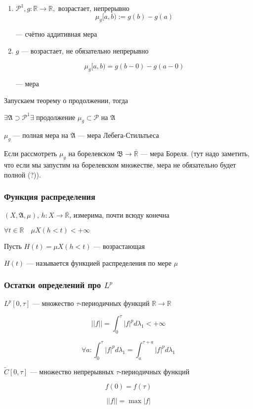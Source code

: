 \documentclass{article}
\def\rinf{\overline{\mathbb{R}}}
\begin{document}
\begin{enumerate}
    \item $\mathcal{P}^{1}, g: \mathbb{R} \rightarrow \mathbb{R}, $ возрастает, непрерывно
    \[\mu_g[a, b) := g(b) - g(a)\]

    --- счётно аддитивная мера
    \item $g$ --- возрастает, не обязательно непрерывно
    
    \[\mu_g[a, b) = g(b - 0) - g(a - 0)\]

    --- мера
\end{enumerate}

Запускаем теорему о продолжении, тогда

$\exists \mathfrak{A} \supset \mathcal{P}^{1} \exists$ продолжение $\mu_g \subset \mathcal{P}$ на $\mathfrak{A}$

$\mu_g$ --- полная мера на $\mathfrak{A}$ --- мера Лебега-Стильтьеса

Если рассмотреть $\mu_g$ на борелевском $\mathfrak{B} \rightarrow \rinf$ --- мера Бореля. (тут надо заметить, что если мы запустим на борелевском множестве, мера не обязательно будет полной (?)).


\subsubsection{Функция распределения}
$(X, \mathfrak{A}, \mu)$, $h: X \rightarrow \rinf$, измерима, почти всюду конечна

$\forall t \in \mathbb{R} \quad \mu X(h < t) < +\infty$

Пусть $H(t) = \mu X(h < t)$ --- возрастающая

$H(t)$ --- называется функцией распределения по мере $\mu$

\subsubsection{Остатки определений про $L^p$}

$L^p[0, \tau]$ --- множество $\tau$-периодичных функций $\mathbb{R} \rightarrow \mathbb{R}$

\[||f|| = \int_0^{\tau} |f|^p d\lambda_1 < +\infty\]

\[\forall a : \int_0^{\tau} |f|^p d\lambda_1 = \int_a^{\tau + a} |f|^p d\lambda_1\]

$\tilde{C}[0, \tau]$ --- множество непрерывных $\tau$-периодичных функций

\[f(0) = f(\tau)\]

\[||f|| = \max{|f|}\]
\end{document}
